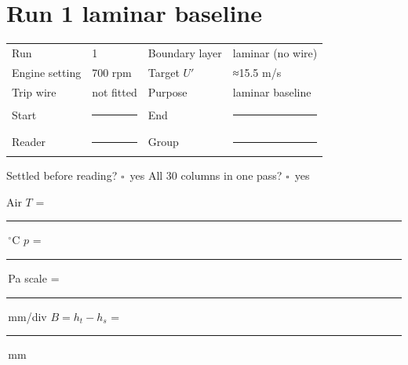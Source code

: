 \documentclass[10pt,a4paper]{article}
\newcommand{\blank}{\rule{1.55cm}{0.4pt}}
\newcommand{\checkbox}{\ensuremath{\square}}
\begin{document}
\clearpage

\clearpage
\section*{Run 1 \hfill \normalsize laminar baseline}

\begin{tabularx}{\textwidth}{@{}p{3.1cm}p{2.7cm}p{3.0cm}X@{}}
\toprule
Run & 1 & Boundary layer & laminar (no wire) \\
Engine setting & 700 rpm & Target $U'$ & ≈15.5 m/s \\
Trip wire & not fitted & Purpose & laminar baseline \\
Start & \blank & End & \blank \\
Reader & \blank & Group & \blank \\
\bottomrule
\end{tabularx}

{\small Settled before reading? \checkbox\ yes \qquad All 30 columns in one pass? \checkbox\ yes\par
Air $T$ = \blank\,$^\circ$C \qquad $p$ = \blank\,Pa \qquad
scale = \blank\,mm/div \qquad $B=h_t-h_s$ = \blank\,mm}
\end{document}
